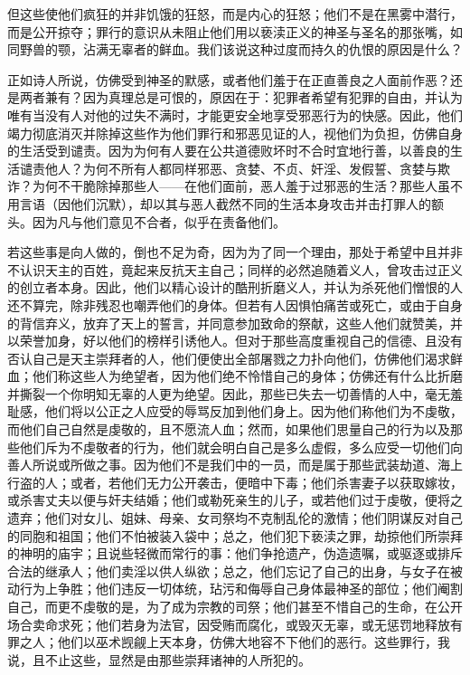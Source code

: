 \par

但这些使他们疯狂的并非饥饿的狂怒，而是内心的狂怒；他们不是在黑雾中潜行，而是公开掠夺；罪行的意识从未阻止他们用以亵渎正义的神圣与圣名的那张嘴，如同野兽的颚，沾满无辜者的鲜血。我们该说这种过度而持久的仇恨的原因是什么？\par

\par

正如诗人所说，仿佛受到神圣的默感，或者他们羞于在正直善良之人面前作恶？还是两者兼有？因为真理总是可恨的，原因在于：犯罪者希望有犯罪的自由，并认为唯有当没有人对他的过失不满时，才能更安全地享受邪恶行为的快感。因此，他们竭力彻底消灭并除掉这些作为他们罪行和邪恶见证的人，视他们为负担，仿佛自身的生活受到谴责。因为为何有人要在公共道德败坏时不合时宜地行善，以善良的生活谴责他人？为何不所有人都同样邪恶、贪婪、不贞、奸淫、发假誓、贪婪与欺诈？为何不干脆除掉那些人——在他们面前，恶人羞于过邪恶的生活？那些人虽不用言语（因他们沉默），却以其与恶人截然不同的生活本身攻击并击打罪人的额头。因为凡与他们意见不合者，似乎在责备他们。\par

若这些事是向人做的，倒也不足为奇，因为为了同一个理由，那处于希望中且并非不认识天主的百姓，竟起来反抗天主自己；同样的必然追随着义人，曾攻击过正义的创立者本身。因此，他们以精心设计的酷刑折磨义人，并认为杀死他们憎恨的人还不算完，除非残忍也嘲弄他们的身体。但若有人因惧怕痛苦或死亡，或由于自身的背信弃义，放弃了天上的誓言，并同意参加致命的祭献，这些人他们就赞美，并以荣誉加身，好以他们的榜样引诱他人。但对于那些高度重视自己的信德、且没有否认自己是天主崇拜者的人，他们便使出全部屠戮之力扑向他们，仿佛他们渴求鲜血；他们称这些人为绝望者，因为他们绝不怜惜自己的身体；仿佛还有什么比折磨并撕裂一个你明知无辜的人更为绝望。因此，那些已失去一切善情的人中，毫无羞耻感，他们将以公正之人应受的辱骂反加到他们身上。因为他们称他们为不虔敬，而他们自己自然是虔敬的，且不愿流人血；然而，如果他们思量自己的行为以及那些他们斥为不虔敬者的行为，他们就会明白自己是多么虚假，多么应受一切他们向善人所说或所做之事。因为他们不是我们中的一员，而是属于那些武装劫道、海上行盗的人；或者，若他们无力公开袭击，便暗中下毒；他们杀害妻子以获取嫁妆，或杀害丈夫以便与奸夫结婚；他们或勒死亲生的儿子，或若他们过于虔敬，便将之遗弃；他们对女儿、姐妹、母亲、女司祭均不克制乱伦的激情；他们阴谋反对自己的同胞和祖国；他们不怕被装入袋中；总之，他们犯下亵渎之罪，劫掠他们所崇拜的神明的庙宇；且说些轻微而常行的事：他们争抢遗产，伪造遗嘱，或驱逐或排斥合法的继承人；他们卖淫以供人纵欲；总之，他们忘记了自己的出身，与女子在被动行为上争胜；他们违反一切体统，玷污和侮辱自己身体最神圣的部位；他们阉割自己，而更不虔敬的是，为了成为宗教的司祭；他们甚至不惜自己的生命，在公开场合卖命求死；他们若身为法官，因受贿而腐化，或毁灭无辜，或无惩罚地释放有罪之人；他们以巫术觊觎上天本身，仿佛大地容不下他们的恶行。这些罪行，我说，且不止这些，显然是由那些崇拜诸神的人所犯的。\par

